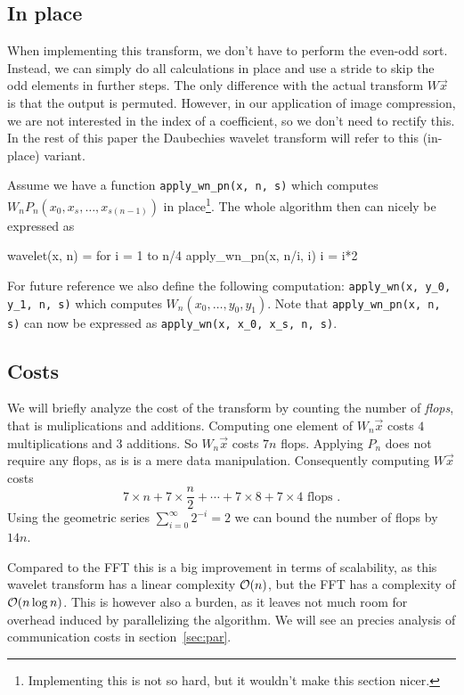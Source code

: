 \subsection{In place}
When implementing this transform, we don't have to perform the even-odd sort. Instead, we can simply do all calculations in place and use a stride to skip the odd elements in further steps. The only difference with the actual transform $W \vec{x}$ is that the output is permuted. However, in our application of image compression, we are not interested in the index of a coefficient, so we don't need to rectify this. In the rest of this paper the Daubechies wavelet transform will refer to this (in-place) variant.

Assume we have a function \texttt{apply_wn_pn(x, n, s)} which computes $W_n P_n (x_0, x_s, \ldots, x_{s(n-1)})$ in place\footnote{Implementing this is not so hard, but it wouldn't make this section nicer.}. The whole algorithm then can nicely be expressed as

\begin{lstlistings}
wavelet(x, n) =
	for i = 1 to n/4
		apply_wn_pn(x, n/i, i)
		i = i*2
\end{lstlistings}

For future reference we also define the following computation: \texttt{apply_wn(x, y_0, y_1, n, s)} which computes $W_n (x_0, \ldots, y_0, y_1)$. Note that \texttt{apply_wn_pn(x, n, s)} can now be expressed as \texttt{apply_wn(x, x_0, x_s, n, s)}.



\subsection{Costs}
We will briefly analyze the cost of the transform by counting the number of \emph{flops}, that is muliplications and additions. Computing one element of $W_n \vec{x}$ costs $4$ multiplications and $3$ additions. So $W_n \vec{x}$ costs $7n$ flops. Applying  $P_n$ does not require any flops, as is is a mere data manipulation. Consequently computing $W \vec{x}$ costs
\[ 7 \times n + 7 \times \frac{n}{2} + \cdots +  7 \times 8 + 7 \times 4 \text{ flops }. \]
Using the geometric series $\sum_{i=0}^\infty 2^{-i} = 2$ we can bound the number of flops by $14n$.

Compared to the FFT this is a big improvement in terms of scalability, as this wavelet transform has a linear complexity $\mathcal{O}(n)$, but the FFT has a complexity of $\mathcal{O}(n \log n)$. This is however also a burden, as it leaves not much room for overhead induced by parallelizing the algorithm. We will see an precies analysis of communication costs in section~\ref{sec:par}.


